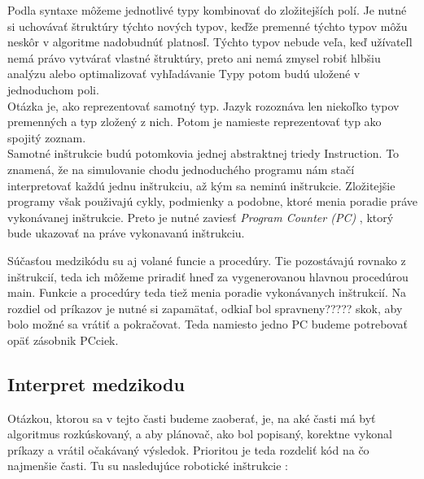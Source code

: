 Podla syntaxe môžeme jednotlivé typy kombinovať do zložitejších polí. Je nutné si uchovávať štruktúry týchto nových typov, keďže premenné týchto typov môžu neskôr v algoritme nadobudnúť platnosľ. Týchto typov nebude veľa, keď užívateľl nemá právo vytvárať vlastné štruktúry, preto ani nemá zmysel robiť hlbšiu analýzu alebo optimalizovať vyhľadávanie Typy potom budú uložené v jednoduchom poli. \\

Otázka je, ako reprezentovať samotný typ. Jazyk rozoznáva len niekoľko typov premenných a typ zložený z nich. Potom je namieste reprezentovať typ ako spojitý zoznam. \\

Samotné inštrukcie budú potomkovia jednej abstraktnej triedy Instruction. To znamená, že na simulovanie chodu jednoduchého programu nám stačí interpretovať každú jednu inštrukciu, až kým sa neminú inštrukcie. Zložitejšie programy však použivajú cykly, podmienky a podobne, ktoré menia poradie práve vykonávanej inštrukcie. Preto je nutné zaviesť {\it Program Counter (PC) }, ktorý bude ukazovať na  práve vykonavanú inštrukciu.

Súčasťou medzikódu su aj volané funcie a procedúry. Tie pozostávajú rovnako z inštrukcií, teda ich môžeme priradiť hneď za vygenerovanou hlavnou procedúrou main. Funkcie a procedúry teda tiež menia poradie vykonávanych inštrukcií. Na rozdiel od príkazov je nutné si zapamätať, odkiaľ bol spravneny????? skok, aby bolo možné sa vrátiť a pokračovat. Teda namiesto jedno PC budeme potrebovať opäť zásobnik PCciek.\\

\subsection{Interpret medzikodu}

Otázkou, ktorou sa v tejto časti budeme zaoberať, je, na aké časti má byť algoritmus rozkúskovaný, a aby plánovač, ako bol popisaný, korektne vykonal príkazy a vrátil očakávaný výsledok. Prioritou je teda rozdeliť kód na čo najmenšie časti. Tu su nasledujúce robotické inštrukcie :%

